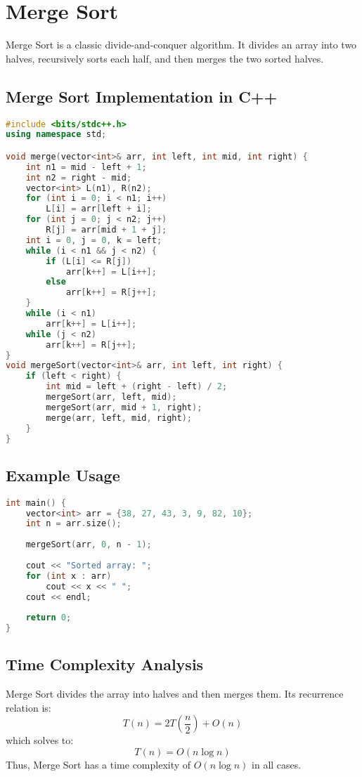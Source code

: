 \section{Merge Sort}
Merge Sort is a classic divide-and-conquer algorithm. It divides an array into two halves, recursively sorts each half, and then merges the two sorted halves.

\subsection{Merge Sort Implementation in C++}
\begin{lstlisting}[language=C++, caption={Merge Sort Implementation}]
#include <bits/stdc++.h>
using namespace std;

void merge(vector<int>& arr, int left, int mid, int right) {
    int n1 = mid - left + 1; 
    int n2 = right - mid;
    vector<int> L(n1), R(n2);
    for (int i = 0; i < n1; i++)
        L[i] = arr[left + i];
    for (int j = 0; j < n2; j++)
        R[j] = arr[mid + 1 + j];
    int i = 0, j = 0, k = left;
    while (i < n1 && j < n2) {
        if (L[i] <= R[j])
            arr[k++] = L[i++];
        else
            arr[k++] = R[j++];
    }
    while (i < n1)
        arr[k++] = L[i++];
    while (j < n2)
        arr[k++] = R[j++];
}
void mergeSort(vector<int>& arr, int left, int right) {
    if (left < right) {
        int mid = left + (right - left) / 2;
        mergeSort(arr, left, mid);
        mergeSort(arr, mid + 1, right);
        merge(arr, left, mid, right);
    }
}
\end{lstlisting}

\subsection{Example Usage}
\begin{lstlisting}[language=C++, caption={Using Merge Sort}]
int main() {
    vector<int> arr = {38, 27, 43, 3, 9, 82, 10};
    int n = arr.size();
    
    mergeSort(arr, 0, n - 1);
    
    cout << "Sorted array: ";
    for (int x : arr)
        cout << x << " ";
    cout << endl;
    
    return 0;
}
\end{lstlisting}

\subsection{Time Complexity Analysis}
Merge Sort divides the array into halves and then merges them. Its recurrence relation is:
\[
T(n) = 2T\left(\frac{n}{2}\right) + O(n)
\]
which solves to:
\[
T(n) = O(n \log n)
\]
Thus, Merge Sort has a time complexity of \(O(n \log n)\) in all cases.

